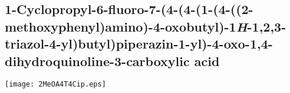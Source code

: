 \subsection{1\hyp{}Cyclopropyl\hyp{}6\hyp{}fluoro\hyp{}7\hyp{}(4\hyp{}(4\hyp{}(1\hyp{}(4\hyp{}((2\hyp{}methoxyphenyl)amino)\hyp{}4\hyp{}oxobutyl)\hyp{}1\textit{H}\hyp{}1,2,3\hyp{}triazol\hyp{}4\hyp{}yl)\allowbreak butyl)piperazin\hyp{}1\hyp{}yl)\hyp{}4\hyp{}oxo\hyp{}1,4\hyp{}dihydroquinoline\hyp{}3\hyp{}car\allowbreak b\allowbreak oxylic acid }


\begin{scheme}[H]
	\begin{center}
		\texttt{[image: 2MeOA4T4Cip.eps]}
	\end{center}
\end{scheme}

